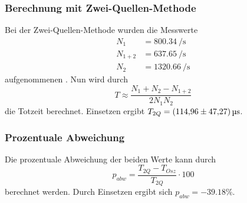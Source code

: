 \subsubsection*{Berechnung mit Zwei-Quellen-Methode}
        Bei der Zwei-Quellen-Methode wurden die Messwerte
        \begin{align*}
            N_1 &= \SI{800.34}{\per\second}\\ %
            N_{1+2} &= \SI{637.65}{\per\second}\\
            N_2 &= \SI{1320.66}{\per\second}
        \end{align*}
        aufgenommenen \cite{AP02}. Nun wird durch
        \begin{equation*}
            T\approx \frac{N_1+N_2-N_{1+2}}{2N_1N_2}
        \end{equation*}
        die Totzeit berechnet. Einsetzen ergibt $T_{2Q}=\SI{114.96 \pm 47.27}{\micro\second}$.
\subsubsection*{Prozentuale Abweichung}
Die prozentuale Abweichung der beiden Werte kann durch
\begin{equation}
    p_{abw}=\frac{T_{2Q}-T_{Osz}}{T_{2Q}}\cdot 100
\end{equation}
berechnet werden. Durch Einsetzen ergibt sich $p_{abw}=\num{-39.18}\%$.

